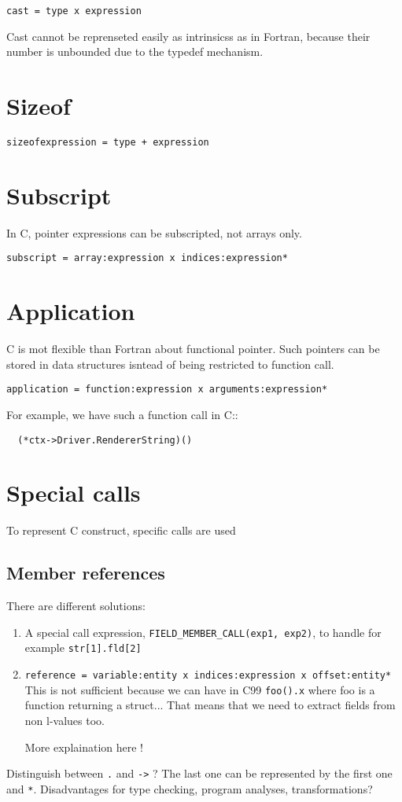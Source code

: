 \documentclass[a4paper]{report}
\begin{document}
\verb/cast = type x expression/

Cast cannot be reprenseted easily as intrinsicss as in Fortran,
 because their number is unbounded due to the typedef mechanism.

\section{Sizeof}
\verb/sizeofexpression = type + expression/

\section{Subscript}

In C, pointer expressions can be subscripted, not arrays only.

\verb/subscript = array:expression x indices:expression*/

\section{Application}

C is mot flexible than Fortran about functional pointer. Such pointers
 can be stored in data structures isntead of being restricted to
 function call.

\verb/application = function:expression x arguments:expression*/

For example, we have such a function call in C::
\begin{lstlisting}
  (*ctx->Driver.RendererString)()
\end{lstlisting}


\section{Special calls}

To represent C construct, specific calls are used

\subsection{Member references }

There are different solutions:
\begin{enumerate}
\item A special call expression, \lstinline/FIELD_MEMBER_CALL(exp1, exp2)/, to handle for example
\lstinline|str[1].fld[2]|
\item
  \verb/reference = variable:entity x indices:expression x offset:entity*/
  This is not sufficient because we can have in C99 \lstinline|foo().x|
  where foo is a function returning a struct... That means that we need to
  extract fields from non l-values too.

More explaination here !
\end{enumerate}
 Distinguish between \texttt{.} and \verb/->/ ? The last one can be represented by
 the first one and \texttt{*}. 
 Disadvantages for type checking, program
analyses, transformations?
\end{document}
